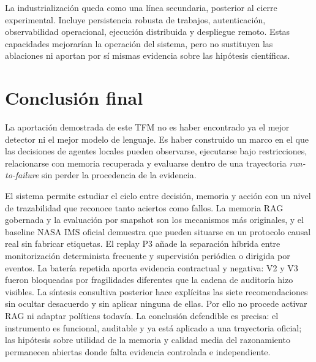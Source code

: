 La industrialización queda como una línea secundaria, posterior al cierre
experimental. Incluye persistencia robusta de trabajos, autenticación,
observabilidad operacional, ejecución distribuida y despliegue remoto. Estas
capacidades mejorarían la operación del sistema, pero no sustituyen las
ablaciones ni aportan por sí mismas evidencia sobre las hipótesis científicas.

\section{Conclusión final}

La aportación demostrada de este TFM no es haber encontrado ya el mejor detector
ni el mejor modelo de lenguaje. Es haber construido un marco en el que las
decisiones de agentes locales pueden observarse, ejecutarse bajo restricciones,
relacionarse con memoria recuperada y evaluarse dentro de una trayectoria
\textit{run-to-failure} sin perder la procedencia de la evidencia.

El sistema permite estudiar el ciclo entre decisión, memoria y acción con un
nivel de trazabilidad que reconoce tanto aciertos como fallos. La memoria RAG
gobernada y la evaluación por snapshot son los mecanismos más originales, y el
baseline NASA IMS oficial demuestra que pueden situarse en un protocolo
causal real sin fabricar etiquetas. El replay P3 añade la separación híbrida
entre monitorización determinista frecuente y supervisión periódica o dirigida
por eventos. La batería repetida aporta evidencia contractual y negativa: V2 y
V3 fueron bloqueadas por fragilidades diferentes que la cadena de auditoría hizo
visibles. La síntesis consultiva posterior hace explícitas las siete
recomendaciones sin ocultar desacuerdo y sin aplicar ninguna de ellas. Por ello
no procede activar RAG ni adaptar políticas todavía. La
conclusión defendible es precisa: el instrumento es funcional, auditable y ya
está aplicado a una trayectoria oficial; las hipótesis sobre utilidad de la
memoria y calidad media del razonamiento permanecen abiertas donde falta
evidencia controlada e independiente.
